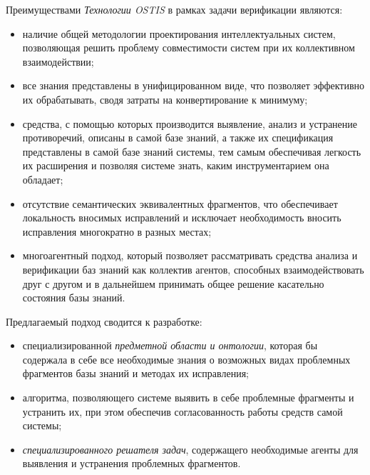 \begin{SCn}
\begin{scnsubstruct}
{Преимуществами \textit{Технологии OSTIS} в рамках задачи верификации являются:
\begin{itemize}
	\item наличие общей методологии проектирования интеллектуальных систем, позволяющая решить проблему совместимости систем при их коллективном взаимодействии;
	\item все знания представлены в унифицированном виде, что позволяет эффективно их обрабатывать, сводя затраты на конвертирование к минимуму;
	\item средства, с помощью которых производится выявление, анализ и устранение противоречий, описаны в самой базе знаний, а также их спецификация представлены в самой базе знаний системы, тем самым обеспечивая легкость их расширения и позволяя системе знать, каким инструментарием она обладает;
	\item отсутствие семантических эквивалентных фрагментов, что обеспечивает локальность вносимых исправлений и исключает необходимость вносить исправления многократно в разных местах;
	\item многоагентный подход, который позволяет рассматривать средства анализа и верификации баз знаний как коллектив агентов, способных взаимодействовать друг с другом и в дальнейшем принимать общее решение касательно состояния базы знаний. 
\end{itemize}

Предлагаемый подход сводится к разработке:
\begin{itemize}
	\item специализированной \textit{предметной области и онтологии}, которая бы содержала в себе все необходимые знания о возможных видах проблемных фрагментов базы знаний и методах их исправления;
	\item алгоритма, позволяющего системе выявить в себе проблемные фрагменты и устранить их, при этом обеспечив согласованность работы средств самой системы;
	\item \textit{специализированного решателя задач}, содержащего необходимые агенты для выявления и устранения проблемных фрагментов.
\end{itemize}
}



\end{scnsubstruct}
\end{SCn}
